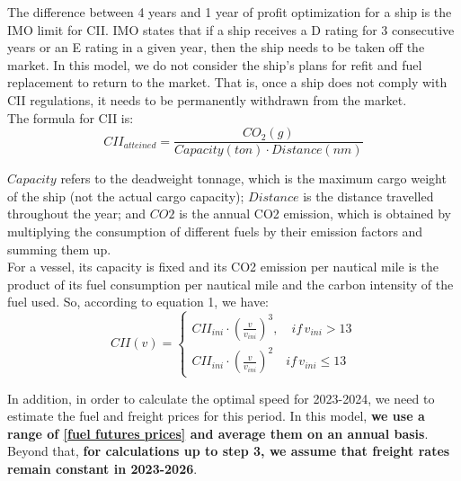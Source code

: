 \documentclass[a4paper,12pt]{article}
\begin{document}
The difference between 4 years and 1 year of profit optimization for a ship is the IMO limit for CII.
IMO states that if a ship receives a D rating for 3 consecutive years or an E rating in a given year, then the ship needs to be taken off the market.
In this model, we do not consider the ship's plans for refit and fuel replacement to return to the market.
That is, once a ship does not comply with CII regulations, it needs to be permanently withdrawn from the market.\\

The formula for CII is:
\begin{equation}
	\label{eq:cii}
	CII_{atteined} = \frac{CO_2(g)}{Capacity(ton) \cdot Distance(nm)}
\end{equation}

$Capacity$ refers to the deadweight tonnage, which is the maximum cargo weight of the ship (not the actual cargo capacity);
$Distance$ is the distance travelled throughout the year;
and $CO2$ is the annual CO2 emission, which is obtained by multiplying the consumption of different fuels by their emission factors and summing them up.\\

For a vessel, its capacity is fixed and its CO2 emission per nautical mile is the product of its fuel consumption per nautical mile and the carbon intensity of the fuel used.
So, according to equation 1, we have:
\begin{equation}
	\label{eq:cii_model}
	CII(v) =
	\left\{
	\begin{aligned}
		CII_{ini}\cdot (\frac{v}{v_{ini}})^3, \quad if \, v_{ini} > 13 \\
		CII_{ini} \cdot (\frac{v}{v_{ini}})^2 \quad if \, v_{ini}\leq 13
	\end{aligned}
	\right.
\end{equation}

In addition, in order to calculate the optimal speed for 2023-2024, we need to estimate the fuel and freight prices for this period.
In this model, \textbf{we use a range of \href{https://www.cmegroup.com/markets/energy/refined-products/singapore-380cst-fuel-oil-platts-swap-futures.html}{[fuel futures prices]} and average them on an annual basis}.
Beyond that, \textbf{for calculations up to step 3, we assume that freight rates remain constant in 2023-2026}.\\
\end{document}
